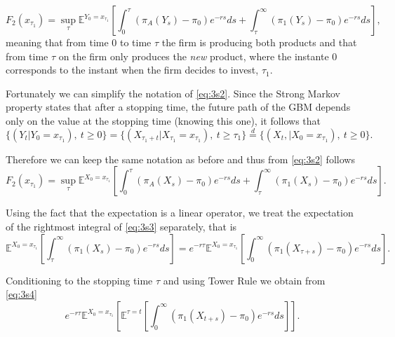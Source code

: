 \begin{equation}
F_2(x_{\tau_1})=\sup_{\tau} \mathds{E}^{Y_0=x_{\tau_1}} \left[ \int_0^{\tau} \left( \pi_A(Y_s)-\pi_0 \right) e^{-rs}ds + \int_{\tau}^\infty \left( \pi_1(Y_s)-\pi_0 \right) e^{-rs}ds  \right],
\label{eq:3s2}
\end{equation}
meaning that from time 0 to time $\tau$ the firm is producing both products and that from time $\tau$ on the firm only produces the \textit{new} product, where the instante 0 corresponds to the instant when the firm decides to invest, $\tau_1$.

Fortunately we can simplify the notation of \eqref{eq:3s2}. Since the Strong Markov property states that after a stopping time, the future path of the GBM depends only on the value at the stopping time (knowing this one), it follows that 
$$\{(Y_t | Y_0=x_{\tau_1}), \ t\geq0 \} = \{(X_{\tau_1+t} | X_{\tau_1}=x_{\tau_1}),\ t\geq \tau_1 \} \overset{d}{=}  \{(X_{t}, | X_0=x_{\tau_1}), \ t\geq0 \}. $$

Therefore we can keep the same notation as before and thus from \eqref{eq:3s2} follows
\begin{equation}
F_2(x_{\tau_1})=\sup_{\tau} \mathds{E}^{X_0=x_{\tau_1}} \left[ \int_0^{\tau} \left( \pi_A(X_s)-\pi_0 \right) e^{-rs}ds + \int_{\tau}^\infty \left( \pi_1(X_s)-\pi_0 \right) e^{-rs}ds  \right].
\label{eq:3s3}
\end{equation}


Using the fact that the expectation is a linear operator, we treat the expectation of the rightmost integral of \eqref{eq:3s3} separately, that is
\begin{equation}
\mathds{E}^{X_0=x_{\tau_1}} \left[  \int_{\tau}^\infty \left( \pi_1(X_s)-\pi_0 \right) e^{-rs}ds  \right] =  e^{-r\tau} \mathds{E}^{X_0=x_{\tau_1}} \left[  \int_{0}^\infty \left( \pi_1(X_{\tau+s})-\pi_0 \right) e^{-rs}ds  \right].
\label{eq:3s4}
\end{equation}

Conditioning to the stopping time $\tau$ and using Tower Rule we obtain from \eqref{eq:3s4}
\begin{equation}
e^{-r\tau} \mathds{E}^{X_0=x_{\tau_1}} \left[ \mathds{E}^{\tau=t}  \left[ \int_{0}^\infty \left( \pi_1(X_{t+s})-\pi_0 \right) e^{-rs}ds  \right] \right].
\label{eq:3s5}
\end{equation}

